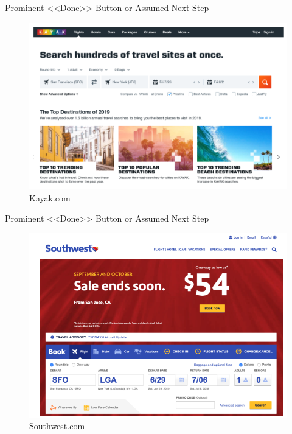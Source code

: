 \documentclass{beamer}
\begin{document}
\begin{frame}[t]{Prominent <<Done>> Button or Assumed Next Step}
	\begin{figure}[h]
		\centering
		\includegraphics[scale=0.6]{images/lec08-pic11.png}
		\caption{Kayak.com}
	\end{figure}
\end{frame}

\begin{frame}[t]{Prominent <<Done>> Button or Assumed Next Step}
	\begin{figure}[h]
		\centering
		\includegraphics[scale=0.6]{images/lec08-pic12.png}
		\caption{Southwest.com}
	\end{figure}
\end{frame}
\end{document}
